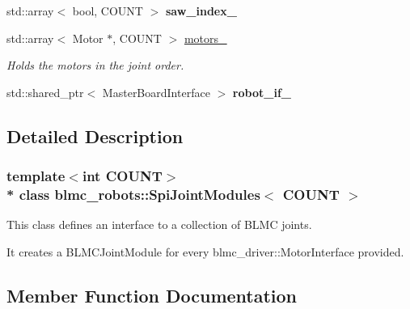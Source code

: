 \begin{DoxyCompactItemize}
\item 
std\+::array$<$ bool, C\+O\+U\+NT $>$ {\bfseries saw\+\_\+index\+\_\+}\hypertarget{classblmc__robots_1_1SpiJointModules_a039c25eda9a899f86787f4adfc5a0339}{}\label{classblmc__robots_1_1SpiJointModules_a039c25eda9a899f86787f4adfc5a0339}

\item 
std\+::array$<$ Motor $\ast$, C\+O\+U\+NT $>$ \hyperlink{classblmc__robots_1_1SpiJointModules_a75e008104482474a6d5120ac43cb15a2}{motors\+\_\+}\hypertarget{classblmc__robots_1_1SpiJointModules_a75e008104482474a6d5120ac43cb15a2}{}\label{classblmc__robots_1_1SpiJointModules_a75e008104482474a6d5120ac43cb15a2}

\begin{DoxyCompactList}\small\item\em Holds the motors in the joint order. \end{DoxyCompactList}\item 
std\+::shared\+\_\+ptr$<$ Master\+Board\+Interface $>$ {\bfseries robot\+\_\+if\+\_\+}\hypertarget{classblmc__robots_1_1SpiJointModules_a4b0c786e8d478d6c85955d01439ccd46}{}\label{classblmc__robots_1_1SpiJointModules_a4b0c786e8d478d6c85955d01439ccd46}

\end{DoxyCompactItemize}


\subsection{Detailed Description}
\subsubsection*{template$<$int C\+O\+U\+NT$>$\\*
class blmc\+\_\+robots\+::\+Spi\+Joint\+Modules$<$ C\+O\+U\+N\+T $>$}

This class defines an interface to a collection of B\+L\+MC joints. 

It creates a B\+L\+M\+C\+Joint\+Module for every blmc\+\_\+driver\+::\+Motor\+Interface provided. 

\subsection{Member Function Documentation}

